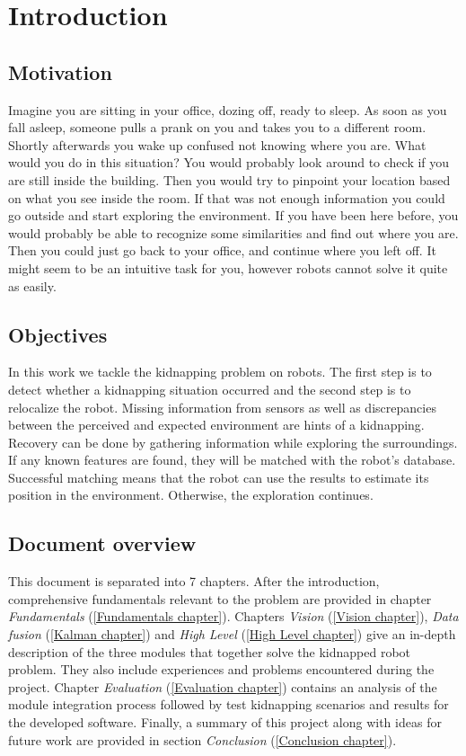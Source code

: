 \chapter{Introduction}
\section{Motivation}

Imagine you are sitting in your office, dozing off, ready to sleep. As soon as you fall asleep, someone pulls a prank on you and takes you to a different room. Shortly afterwards you wake up confused not knowing where you are. What would you do in this situation? You would probably look around to check if you are still inside the building. Then you would try to pinpoint your location based on what you see inside the room. If that was not enough information you could go outside and start exploring the environment. If you have been here before, you would probably be able to recognize some similarities and find out where you are. Then you could just go back to your office, and continue where you left off. It might seem to be an intuitive task for you, however robots cannot solve it quite as easily.

\section{Objectives}

In this work we tackle the kidnapping problem on robots. The first step is to detect whether a kidnapping situation occurred and the second step is to relocalize the robot. Missing information from sensors as well as discrepancies between the perceived and expected environment are hints of a kidnapping. Recovery can be done by gathering information while exploring the surroundings. If any known features are found, they will be matched with the robot's database. Successful matching means that the robot can use the results to estimate its position in the environment. Otherwise, the exploration continues.

\section{Document overview}
This document is separated into 7 chapters. After the introduction, comprehensive fundamentals relevant to the problem are provided in chapter \textit{Fundamentals} (\ref{Fundamentals chapter}). Chapters \textit{Vision} (\ref{Vision chapter}), \textit{Data fusion} (\ref{Kalman chapter}) and \textit{High Level} (\ref{High Level chapter}) give an in-depth description of the three modules that together solve the kidnapped robot problem. They also include experiences and problems encountered during the project. Chapter \textit{Evaluation} (\ref{Evaluation chapter}) contains an analysis of the module integration process followed by test kidnapping scenarios and results for the developed software. Finally, a summary of this project along with ideas for future work are provided in section \textit{Conclusion} (\ref{Conclusion chapter}).

